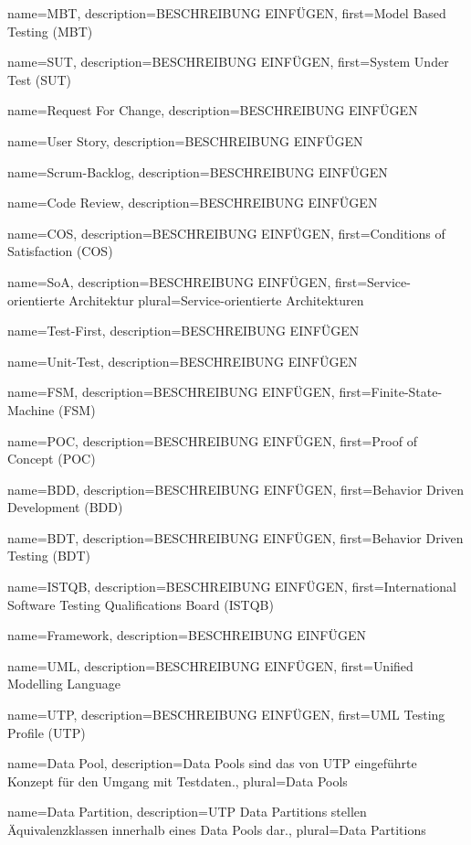  {
	name={MBT},
	description={BESCHREIBUNG EINFÜGEN},
	first={Model Based Testing (MBT)}
}

 {
	name={SUT},
	description={BESCHREIBUNG EINFÜGEN},
	first={System Under Test (SUT)}
}

 {
	name={Request For Change},
	description={BESCHREIBUNG EINFÜGEN}
}

 {
	name={User Story},
	description={BESCHREIBUNG EINFÜGEN}
}

 {
	name={Scrum-Backlog},
	description={BESCHREIBUNG EINFÜGEN}
}

 {
	name={Code Review},
	description={BESCHREIBUNG EINFÜGEN}
}

 {
	name={COS},
	description={BESCHREIBUNG EINFÜGEN},
	first={Conditions of Satisfaction (COS)}
}

 {
	name={SoA},
	description={BESCHREIBUNG EINFÜGEN},
	first={Service-orientierte Architektur}
	plural={Service-orientierte Architekturen}
}

 {
	name={Test-First},
	description={BESCHREIBUNG EINFÜGEN}
}

 {
	name={Unit-Test},
	description={BESCHREIBUNG EINFÜGEN}
}

 {
	name={FSM},
	description={BESCHREIBUNG EINFÜGEN},
	first={Finite-State-Machine (FSM)}
}

 {
	name={POC},
	description={BESCHREIBUNG EINFÜGEN},
	first={Proof of Concept (POC)}
}

 {
	name={BDD},
	description={BESCHREIBUNG EINFÜGEN},
	first={Behavior Driven Development (BDD)}
}

 {
	name={BDT},
	description={BESCHREIBUNG EINFÜGEN},
	first={Behavior Driven Testing (BDT)}
}

 {
	name={ISTQB},
	description={BESCHREIBUNG EINFÜGEN},
	first={International Software Testing Qualifications Board (ISTQB)}
}

 {
	name={Framework},
	description={BESCHREIBUNG EINFÜGEN}
}

 {
	name={UML},
	description={BESCHREIBUNG EINFÜGEN},
	first={Unified Modelling Language}
}

 {
	name={UTP},
	description={BESCHREIBUNG EINFÜGEN},
	first={UML Testing Profile (UTP)}
}

 {
	name={Data Pool},
	description={Data Pools sind das von UTP eingeführte Konzept für den Umgang mit Testdaten.},
	plural={Data Pools}
}

 {
	name={Data Partition},
	description={UTP Data Partitions stellen Äquivalenzklassen innerhalb eines Data Pools dar.},
	plural={Data Partitions}
}